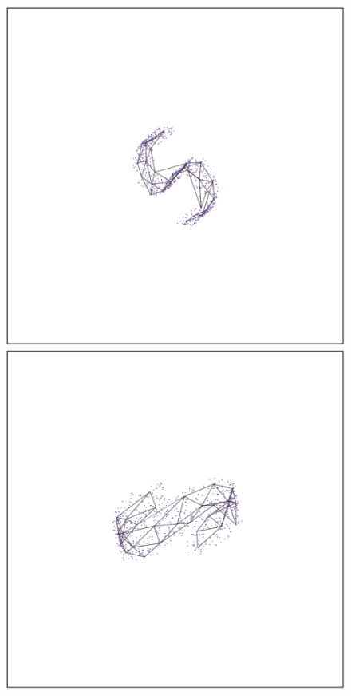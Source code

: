 \documentclass[
  12pt]{article}
\begin{document}
\begin{figure}[H]

\begin{minipage}{0.33\linewidth}
\includegraphics{figures/scurve/sc_1.png}\end{minipage}%
%
\begin{minipage}{0.33\linewidth}
\includegraphics{figures/scurve/sc_2.png}\end{minipage}%

\end{figure}
\end{document}
